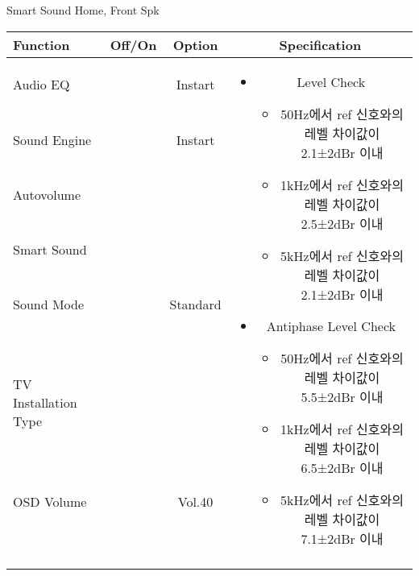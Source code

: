 \begin{frame}[t]{Smart Sound Home, Front Spk}
\begin{tiny}
\begin{tabular}{@{}lccc@{}}
\toprule
Function & Off/On & Option & Specification \\
\midrule
Audio EQ & \color{black}{Off} & Instart &
\multirow{10}{60mm}{
\begin{itemize}
	\item Level Check
	\begin{itemize}
		\item 50Hz에서 ref 신호와의 레벨 차이값이 2.1±2dBr 이내
		\item 1kHz에서 ref 신호와의 레벨 차이값이 2.5±2dBr 이내
		\item 5kHz에서 ref 신호와의 레벨 차이값이 2.1±2dBr 이내
	\end{itemize}
	\item Antiphase Level Check
	\begin{itemize}
		\item 50Hz에서 ref 신호와의 레벨 차이값이 5.5±2dBr 이내
		\item 1kHz에서 ref 신호와의 레벨 차이값이 6.5±2dBr 이내
		\item 5kHz에서 ref 신호와의 레벨 차이값이 7.1±2dBr 이내
	\end{itemize}
\end{itemize}
} \\
Sound Engine & \color{blue}{On} & Instart & \\
Autovolume & \color{black}{Off} & & \\
Smart Sound & \color{blue}{On} & & \\
Sound Mode & \color{blue}{On} & Standard & \\
TV Installation Type & \color{blue}{On} & \color{black}{Standtype1} & \\
OSD Volume & \color{blue}{On} & Vol.40 & \\
& & & \\
& & & \\
& & & \\
& & & \\
\midrule
\end{tabular}
\end{tiny}

\end{frame}




